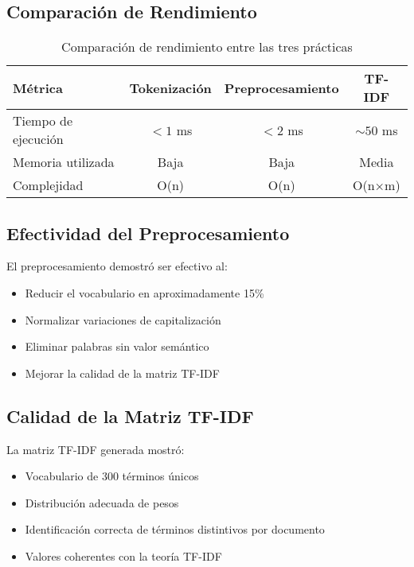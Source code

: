 \documentclass[12pt,a4paper]{article}
\begin{document}
\subsection{Comparación de Rendimiento}

\begin{table}[H]
    \centering
    \begin{tabular}{|l|c|c|c|}
        \hline
        \textbf{Métrica} & \textbf{Tokenización} & \textbf{Preprocesamiento} & \textbf{TF-IDF} \\
        \hline
        Tiempo de ejecución & $< 1$ ms & $< 2$ ms & $\sim 50$ ms \\
        Memoria utilizada & Baja & Baja & Media \\
        Complejidad & O(n) & O(n) & O(n×m) \\
        \hline
    \end{tabular}
    \caption{Comparación de rendimiento entre las tres prácticas}
\end{table}

\subsection{Efectividad del Preprocesamiento}

El preprocesamiento demostró ser efectivo al:
\begin{itemize}
    \item Reducir el vocabulario en aproximadamente 15\%
    \item Normalizar variaciones de capitalización
    \item Eliminar palabras sin valor semántico
    \item Mejorar la calidad de la matriz TF-IDF
\end{itemize}

\subsection{Calidad de la Matriz TF-IDF}

La matriz TF-IDF generada mostró:
\begin{itemize}
    \item Vocabulario de 300 términos únicos
    \item Distribución adecuada de pesos
    \item Identificación correcta de términos distintivos por documento
    \item Valores coherentes con la teoría TF-IDF
\end{itemize}
\end{document}
